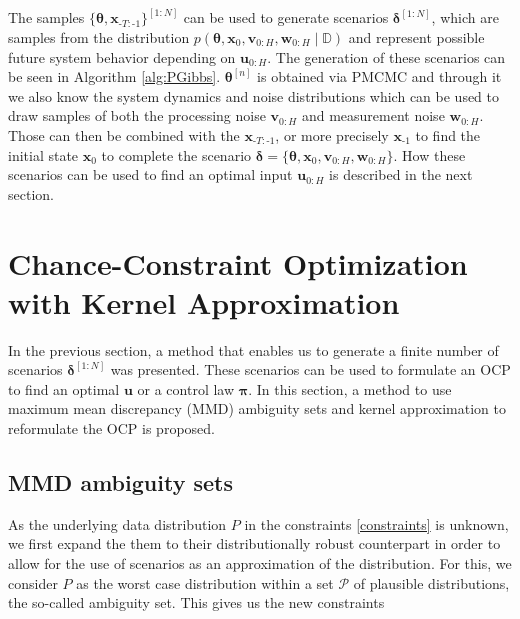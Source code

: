 The samples $\{\boldsymbol{\theta}, \boldsymbol{x}_{\text{-}T:\text{-}1}\}^{[1:N]}$ can be used to generate scenarios $\boldsymbol{\delta}^{[1:N]}$, which are samples from the distribution $p(\boldsymbol{\theta}, \boldsymbol{x}_0, \boldsymbol{v}_{0:H}, \boldsymbol{w}_{0:H} \mid \mathbb{D})$ and represent possible future system behavior depending on $\boldsymbol{u}_{0:H}$. The generation of these scenarios can be seen in Algorithm \ref{alg:PGibbs}. $\boldsymbol{\theta}^{[n]}$ is obtained via PMCMC and through it we also know the system dynamics and noise distributions which can be used to draw samples of both the processing noise $\boldsymbol{v}_{0:H}$ and measurement noise $\boldsymbol{w}_{0:H}$. Those can then be combined with the $\boldsymbol{x}_{\text{-}T:\text{-}1}$, or more precisely $\boldsymbol{x}_{\text{-}1}$ to find the initial state $\boldsymbol{x}_{0}$ to complete the scenario $\boldsymbol{\delta} = \{ \boldsymbol{\theta}, \boldsymbol{x}_0, \boldsymbol{v}_{0:H}, \boldsymbol{w}_{0:H}\}$. How these scenarios can be used to find an optimal input $\boldsymbol{u}_{0:H}$ is described in the next section.


\section{Chance-Constraint Optimization with Kernel Approximation} \label{Sec:CCOKernel}

In the previous section, a method that enables us to generate a finite number of scenarios $\boldsymbol{\delta}^{[1:N]}$ was presented. These scenarios can be used to formulate an OCP to find an optimal $\boldsymbol{u}$ or a control law $\boldsymbol{\pi}$. In this section, a method to use maximum mean discrepancy (MMD) ambiguity sets and kernel approximation to reformulate the OCP is proposed.


\subsection{MMD ambiguity sets} \label{SubSec:MMD}

As the underlying data distribution $P$ in the constraints \ref{constraints} is unknown, we first expand the them to their distributionally robust counterpart in order to allow for the use of scenarios as an approximation of the distribution. For this, we consider $P$ as the worst case distribution within a set $\mathcal{P}$ of plausible distributions, the so-called ambiguity set. This gives us the new constraints

